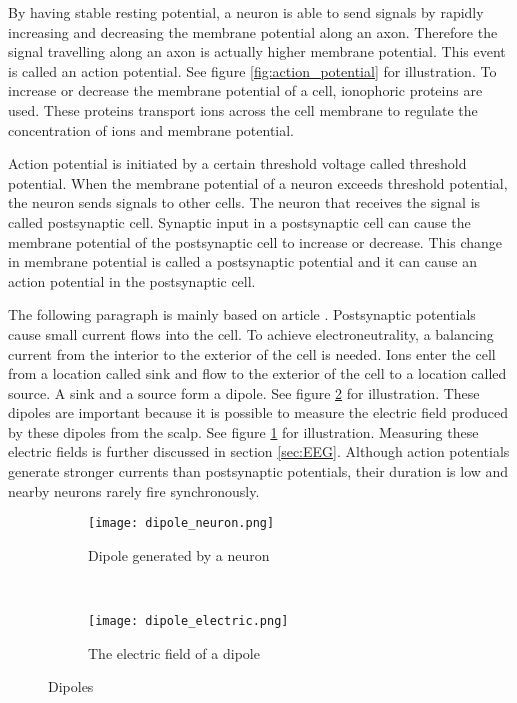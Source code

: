 By having stable resting potential, a neuron is able to send signals by rapidly increasing and decreasing the membrane potential along an axon. Therefore the signal travelling along an axon is actually higher membrane potential. This event is called an action potential. See figure \ref{fig:action_potential} for illustration. To increase or decrease the membrane potential of a cell, ionophoric proteins are used. These proteins transport ions across the cell membrane to regulate the concentration of ions and membrane potential.

Action potential is initiated by a certain threshold voltage called threshold potential. When the membrane potential of a neuron exceeds threshold potential, the neuron sends signals to other cells. The neuron that receives the signal is called postsynaptic cell. Synaptic input in a postsynaptic cell can cause the membrane potential of the postsynaptic cell to increase or decrease. This change in membrane potential is called a postsynaptic potential and it can cause an action potential in the postsynaptic cell.

The following paragraph is mainly based on article \cite{electric_field}. Postsynaptic potentials cause small current flows into the cell. To achieve electroneutrality, a balancing current from the interior to the exterior of the cell is needed. Ions enter the cell from a location called sink and flow to the exterior of the cell to a location called source. A sink and a source form a dipole. See figure \ref{fig:dipole_electric} for illustration. These dipoles are important because it is possible to measure the electric field produced by these dipoles from the scalp. See figure \ref{fig:dipole_neuron} for illustration. Measuring these electric fields is further discussed in section \ref{sec:EEG}. Although action potentials generate stronger currents than postsynaptic potentials, their duration is low and nearby neurons rarely fire synchronously.

\begin{figure}[h!]
	\centering
	\begin{subfigure}{0.48\textwidth}
		\texttt{[image: dipole\_neuron.png]}
		\caption{Dipole generated by a neuron \cite[p.~669]{neuroscience}}
		\label{fig:dipole_neuron}
	\end{subfigure}
	~
	\begin{subfigure}{0.48\textwidth}
		\texttt{[image: dipole\_electric.png]}
		\caption{The electric field of a dipole\protect\footnotemark}
		\label{fig:dipole_electric}
	\end{subfigure}
	\caption{Dipoles}
	\label{fig:dipole}
\end{figure}

